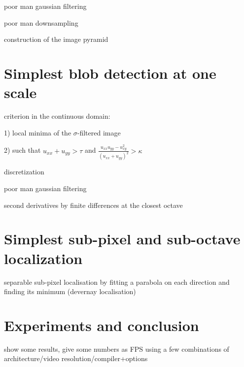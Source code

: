 \documentclass[a4paper]{article}
\begin{document}
poor man gaussian filtering

poor man downsampling

construction of the image pyramid

\section{Simplest blob detection at one scale}

criterion in the continuous domain:

1) local minima of the $\sigma$-filtered image

2) such that $u_{xx}+u_{yy} > \tau$ and
$\frac{u_{xx}u_{yy}-u_{xy}^2}{(u_{xx}+u_{yy})^2}>\kappa$

discretization

poor man gaussian filtering

second derivatives by finite differences at the closest octave


\section{Simplest sub-pixel and sub-octave localization}

separable sub-pixel localisation by fitting a parabola on each direction and
finding its minimum (devernay localisation)

\section{Experiments and conclusion}

show some results, give some numbers as FPS using a few combinations of
architecture/video resolution/compiler+options
\end{document}
